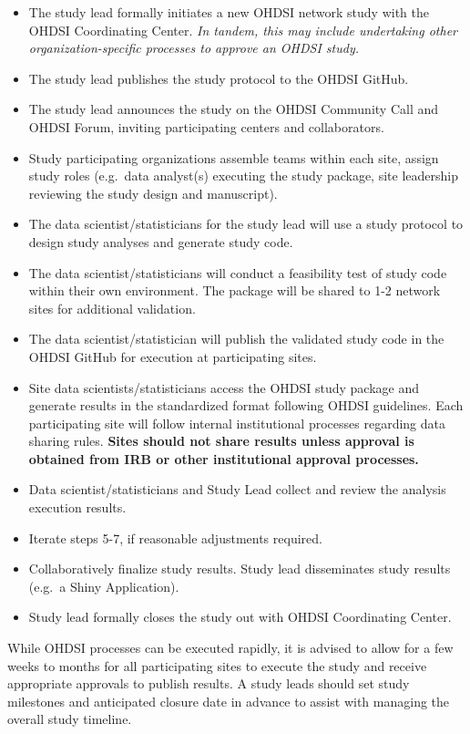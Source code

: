 \documentclass[11pt]{book}
\providecommand{\tightlist}{%
  \setlength{\itemsep}{0pt}\setlength{\parskip}{0pt}}
\theoremstyle{definition}
\theoremstyle{definition}
\theoremstyle{definition}
\theoremstyle{remark}
\begin{document}
\begin{itemize}
\tightlist
\item
  The study lead formally initiates a new OHDSI network study with the OHDSI Coordinating Center. \emph{In tandem, this may include undertaking other organization-specific processes to approve an OHDSI study.}
\item
  The study lead publishes the study protocol to the OHDSI GitHub.
\item
  The study lead announces the study on the OHDSI Community Call and OHDSI Forum, inviting participating centers and collaborators.
\item
  Study participating organizations assemble teams within each site, assign study roles (e.g.~data analyst(s) executing the study package, site leadership reviewing the study design and manuscript).
\item
  The data scientist/statisticians for the study lead will use a study protocol to design study analyses and generate study code.
\item
  The data scientist/statisticians will conduct a feasibility test of study code within their own environment. The package will be shared to 1-2 network sites for additional validation.
\item
  The data scientist/statistician will publish the validated study code in the OHDSI GitHub for execution at participating sites.
\item
  Site data scientists/statisticians access the OHDSI study package and generate results in the standardized format following OHDSI guidelines. Each participating site will follow internal institutional processes regarding data sharing rules. \textbf{Sites should not share results unless approval is obtained from IRB or other institutional approval processes.}
\item
  Data scientist/statisticians and Study Lead collect and review the analysis execution results.
\item
  Iterate steps 5-7, if reasonable adjustments required.
\item
  Collaboratively finalize study results. Study lead disseminates study results (e.g.~a Shiny Application).
\item
  Study lead formally closes the study out with OHDSI Coordinating Center.
\end{itemize}

While OHDSI processes can be executed rapidly, it is advised to allow for a few weeks to months for all participating sites to execute the study and receive appropriate approvals to publish results. A study leads should set study milestones and anticipated closure date in advance to assist with managing the overall study timeline.
\end{document}
